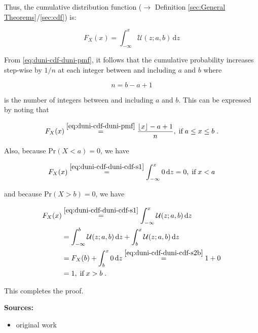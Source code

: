 \documentclass[a4paper,12pt,twoside]{book}
\begin{document}
Thus, the cumulative distribution function ($\rightarrow$ Definition \ref{sec:General Theorems}/\ref{sec:cdf}) is:

\begin{equation} \label{eq:duni-cdf-duni-cdf-s1}
F_X(x) = \int_{-\infty}^{x} \mathcal{U}(z; a, b) \, \mathrm{d}z
\end{equation}

From \eqref{eq:duni-cdf-duni-pmf}, it follows that the cumulative probability increases step-wise by $1/n$ at each integer between and including $a$ and $b$ where

\begin{equation} \label{eq:duni-cdf-n}
n = b - a + 1
\end{equation}

is the number of integers between and including $a$ and $b$. This can be expressed by noting that

\begin{equation} \label{eq:duni-cdf-duni-cdf-s2b}
F_X(x) \overset{\eqref{eq:duni-cdf-duni-pmf}}{=} \frac{\left\lfloor{x}\right\rfloor - a + 1}{n}, \; \text{if} \; a \leq x \leq b \; .
\end{equation}

Also, because $\mathrm{Pr}(X < a) = 0$, we have

\begin{equation} \label{eq:duni-cdf-duni-cdf-s2a}
F_X(x) \overset{\eqref{eq:duni-cdf-duni-cdf-s1}}{=} \int_{-\infty}^{x} 0 \, \mathrm{d}z = 0, \; \text{if} \; x < a
\end{equation}

and because $\mathrm{Pr}(X > b) = 0$, we have

\begin{equation} \label{eq:duni-cdf-duni-cdf-s2c}
\begin{split}
F_X(x) &\overset{\eqref{eq:duni-cdf-duni-cdf-s1}}{=} \int_{-\infty}^{x} \mathcal{U}(z; a, b) \, \mathrm{d}z \\
&= \int_{-\infty}^{b} \mathcal{U}(z; a, b) \, \mathrm{d}z + \int_{b}^{x} \mathcal{U}(z; a, b) \, \mathrm{d}z \\
&= F_X(b) + \int_{b}^{x} 0 \, \mathrm{d}z \overset{\eqref{eq:duni-cdf-duni-cdf-s2b}}{=} 1 + 0 \\
&= 1, \; \text{if} \; x > b \; .
\end{split}
\end{equation}

This completes the proof.


\vspace{1em}
\textbf{Sources:}
\begin{itemize}
\item original work\end{itemize}
\end{document}
